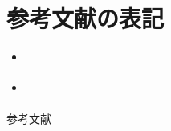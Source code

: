 \documentclass[12pt,xcolor=dvipsnames,table,dvipdfmx, aspectratio=169]{beamer} %
\theoremstyle{definition}
\begin{document}
  \section{参考文献の表記}

  \begin{frame}{\insertsection}
    \begin{itemize}
      \item \citet{arai2013}
      \item \citep{koszegi2014}
    \end{itemize}
  \end{frame}



	\begin{frame}[allowframebreaks]{参考文献} %
			
	\end{frame}
\end{document}
